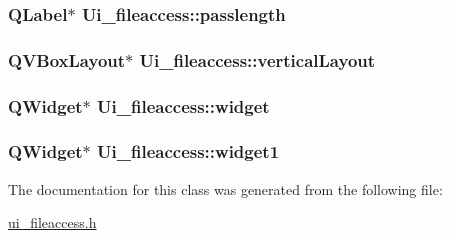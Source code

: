 \hypertarget{classUi__fileaccess_a1aef4018beac84241a85ec99290aac1f}{
\subsubsection[{passlength}]{\setlength{\rightskip}{0pt plus 5cm}Q\-Label$\ast$ Ui\-\_\-fileaccess\-::passlength}}\label{classUi__fileaccess_a1aef4018beac84241a85ec99290aac1f}
\hypertarget{classUi__fileaccess_a3a867523e4669a07d95be16dfe57c358}{
\subsubsection[{vertical\-Layout}]{\setlength{\rightskip}{0pt plus 5cm}Q\-V\-Box\-Layout$\ast$ Ui\-\_\-fileaccess\-::vertical\-Layout}}\label{classUi__fileaccess_a3a867523e4669a07d95be16dfe57c358}
\hypertarget{classUi__fileaccess_a05cbbdd1e0f8a2ecee4cb7be6e3716d1}{
\subsubsection[{widget}]{\setlength{\rightskip}{0pt plus 5cm}Q\-Widget$\ast$ Ui\-\_\-fileaccess\-::widget}}\label{classUi__fileaccess_a05cbbdd1e0f8a2ecee4cb7be6e3716d1}
\hypertarget{classUi__fileaccess_abdebb9daac6cb94e193aee7fcb44742b}{
\subsubsection[{widget1}]{\setlength{\rightskip}{0pt plus 5cm}Q\-Widget$\ast$ Ui\-\_\-fileaccess\-::widget1}}\label{classUi__fileaccess_abdebb9daac6cb94e193aee7fcb44742b}


The documentation for this class was generated from the following file\-:\begin{DoxyCompactItemize}
\item 
\hyperlink{ui__fileaccess_8h}{ui\-\_\-fileaccess.\-h}\end{DoxyCompactItemize}
